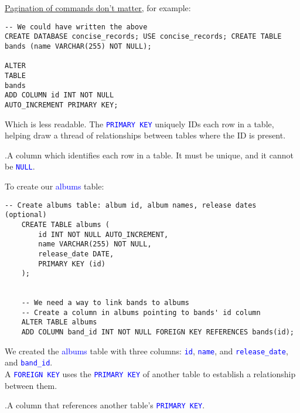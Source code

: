 \noindent
\underline{Pagination of commands don't matter,} for example:
\begin {lstlisting}[style=sql]
-- We could have written the above
CREATE DATABASE concise_records; USE concise_records; CREATE TABLE bands (name VARCHAR(255) NOT NULL);

ALTER
TABLE
bands
ADD COLUMN id INT NOT NULL
AUTO_INCREMENT PRIMARY KEY;
\end{lstlisting}

\noindent
Which is less readable. The \textcolor{blue}{\texttt{PRIMARY KEY}} uniquely IDs each row in a table, helping draw a thread of relationships between tables where the ID is present.\\

\newpage

\noindent
\begin{Def}
    .A column which identifies each row in a table. It must be unique, and it cannot be \textcolor{blue}{\texttt{NULL}}.
\end{Def}

\noindent
To create our \textcolor{blue}{albums} table:

\begin{lstlisting}[style=sql]
    -- Create albums table: album id, album names, release dates (optional)
    CREATE TABLE albums (
        id INT NOT NULL AUTO_INCREMENT,
        name VARCHAR(255) NOT NULL,
        release_date DATE,
        PRIMARY KEY (id)
    );


    -- We need a way to link bands to albums
    -- Create a column in albums pointing to bands' id column
    ALTER TABLE albums
    ADD COLUMN band_id INT NOT NULL FOREIGN KEY REFERENCES bands(id);

\end{lstlisting}

\vspace{1em}
\noindent
We created the \textcolor{blue}{albums} table with three columns: \textcolor{blue}{\texttt{id}}, \textcolor{blue}{\texttt{name}}, and \textcolor{blue}{\texttt{release\_date}},
and \textcolor{blue}{\texttt{band\_id}}.\\ A \textcolor{blue}{\texttt{FOREIGN KEY}} uses the \textcolor{blue}{\texttt{PRIMARY KEY}} of another table to establish a relationship between them.\\

\begin{Def}
    .A column that references another table's \textcolor{blue}{\texttt{PRIMARY KEY}}.
\end{Def}

